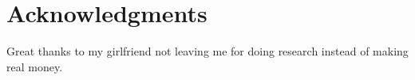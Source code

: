 \section*{Acknowledgments}

Great thanks to my girlfriend not leaving me for doing research instead of making real money.
